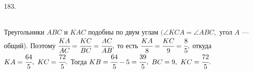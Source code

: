 183. \begin{figure}[ht!]
\end{figure}\\
Треугольники $ABC$ и $KAC$ подобны по двум углам $(\angle KCA = \angle ABC,$ угол $A$ --- общий). Поэтому $\cfrac{KA}{AC}=\cfrac{KC}{BC}=\cfrac{AC}{AB},$ то есть
$\cfrac{KA}{8}=\cfrac{KC}{9}=\cfrac{8}{5},$ откуда $KA=\cfrac{64}{5},\ KC=\cfrac{72}{5}.$ Тогда $KB=\cfrac{64}{5}-5=\cfrac{39}{5},\ BC=9,\ KC=\cfrac{72}{5}.$\\
